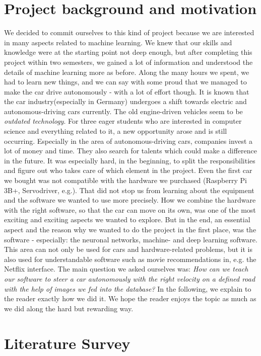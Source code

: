 \documentclass[journal]{IEEEtran}
\begin{document}
\section{Project background and motivation}
\label{sec:backgroundMotivation}
We decided to commit ourselves to this kind of project because we are interested in many aspects related to machine learning. We knew that our skills and knowledge were at the starting point not deep enough, but after completing this project within two semesters, we gained a lot of information and understood the details of machine learning more as before. Along the many hours we spent, we had to learn new things, and we can say with some proud that we managed to make the car drive autonomously - with a lot of effort though.
It is known that the car industry(especially in Germany) undergoes a shift towards electric and autonomous-driving cars currently. The old engine-driven vehicles seem to be \textit{outdated technology}. For three eager students who are interested in computer science and everything related to it, a new opportunity arose and is still occurring. Especially in the area of autonomous-driving cars, companies invest a lot of money and time. They also search for talents which could make a difference in the future. It was especially hard, in the beginning, to split the responsibilities and figure out who takes care of which element in the project. Even the first car we bought was not compatible with the hardware we purchased (Raspberry Pi 3B+, Servodriver, e.g.). That did not stop us from learning about the equipment and the software we wanted to use more precisely. How we combine the hardware with the right software, so that the car can move on its own, was one of the most exciting and exciting aspects we wanted to explore.
But in the end, an essential aspect and the reason why we wanted to do the project in the first place, was the software - especially: the neuronal networks, machine- and deep learning software. This area can not only be used for cars and hardware-related problems, but it is also used for understandable software such as movie recommendations in, e.g. the Netflix interface.
The main question we asked ourselves was: \textit{How can we teach our software to steer a car autonomously with the right velocity on a defined road with the help of images we fed into the database?} In the following, we explain to the reader exactly how we did it. We hope the reader enjoys the topic as much as we did along the hard but rewarding way.
\section{Literature Survey}
\label{sec:LiteratureSurvey}
\end{document}
